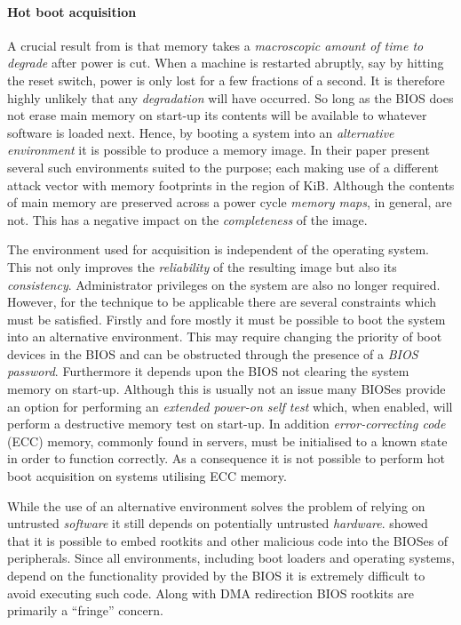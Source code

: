 \documentclass[numbers=noenddot,      %
               abstract,              %
               captions=tableheading, %
               DIV=8]                 %
              {scrartcl}
\begin{document}
\paragraph{Hot boot acquisition}
A crucial result from \cite{halderman08} is that memory takes a
\emph{macroscopic amount of time to degrade} after power is cut. When a
machine is restarted abruptly, say by hitting the reset switch, power is
only lost for a few fractions of a second. It is therefore highly
unlikely that any \emph{degradation} will have occurred. So long as the
BIOS does not erase main memory on start-up its contents will be
available to whatever software is loaded next. Hence, by booting a
system into an \emph{alternative environment} it is possible to produce
a memory image. In their paper \citeauthor{halderman08} present several
such environments suited to the purpose; each making use of a different
attack vector with memory footprints in the region of
\unit[10]{KiB}. Although the contents of main memory are preserved
across a power cycle \emph{memory maps}, in general, are not. This has a
negative impact on the \emph{completeness} of the image.

The environment used for acquisition is independent of the operating
system. This not only improves the \emph{reliability} of the resulting
image but also its \emph{consistency}. Administrator privileges on the
system are also no longer required. However, for the technique to be
applicable there are several constraints which must be satisfied.
Firstly and fore mostly it must be possible to boot the system into an
alternative environment. This may require changing the priority of boot
devices in the BIOS and can be obstructed through the presence of a
\emph{BIOS password}. Furthermore it depends upon the BIOS not clearing
the system memory on start-up. Although this is usually not an issue
many BIOSes provide an option for performing an \emph{extended power-on
  self test} which, when enabled, will perform a destructive memory test
on start-up. In addition \emph{error-correcting code} (ECC) memory,
commonly found in servers, must be initialised to a known state in order
to function correctly. As a consequence it is not possible to perform
hot boot acquisition on systems utilising ECC memory.

While the use of an alternative environment solves the problem of
relying on untrusted \emph{software} it still depends on potentially
untrusted \emph{hardware}. \cite{heasman06} showed that it is possible
to embed rootkits and other malicious code into the BIOSes of
peripherals. Since all environments, including boot loaders and
operating systems, depend on the functionality provided by the BIOS it
is extremely difficult to avoid executing such code. Along with DMA
redirection \citep{rutkowska07} BIOS rootkits are primarily a ``fringe''
concern.
\end{document}
